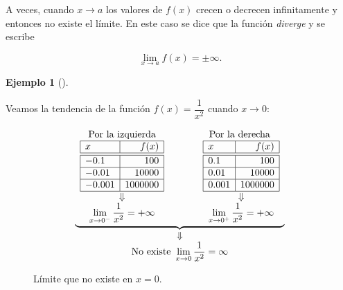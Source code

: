\documentclass[
  a4paper,
]{scrreport}
\theoremstyle{plain}
\theoremstyle{plain}
\theoremstyle{definition}
\theoremstyle{plain}
\theoremstyle{definition}
\newtheorem{example}{Ejemplo}[chapter]
\theoremstyle{remark}
\begin{document}
A veces, cuando \(x\to a\) los valores de \(f(x)\) crecen o decrecen
infinitamente y entonces no existe el límite. En este caso se dice que
la función \emph{diverge} y se escribe

\[\lim_{x\to a}f(x)=\pm \infty.\]

\leavevmode{}%
\begin{example}[]\label{exm-limites-no-existen-3}

Veamos la tendencia de la función \(f(x)=\dfrac{1}{x^2}\) cuando
\(x\to 0\):

\[
\begin{array}{c}
\underbrace{\begin{array}{ccc}
\textrm{Por la izquierda} & \qquad & \textrm{Por la derecha }\\
\begin{array}{|l|r|}
\hline
x      & f(x)   \\
\hline\hline
 -0.1   & 100       \\
\hline
 -0.01   & 10000     \\
\hline
 -0.001  & 1000000   \\
\hline
\end{array}
& &
\begin{array}{|l|r|}
\hline
x      & f(x)   \\
\hline\hline
 0.1    & 100       \\
\hline
 0.01   & 10000    \\
\hline
 0.001  & 1000000   \\
\hline
\end{array}\\
\Downarrow & & \Downarrow\\
\displaystyle \lim_{x\to 0^-}\frac{1}{x^2}=+\infty
& &
\displaystyle \lim_{x\to 0^+}\frac{1}{x^2}=+\infty
\end{array}}\\
\Downarrow\\
\displaystyle \textrm{No existe }\lim_{x\to 0}\frac{1}{x^2}=\infty
\end{array}
\]

\begin{figure}

{\centering 



}

\caption{Límite que no existe en \(x=0\).}

\end{figure}

\end{example}
\end{document}
